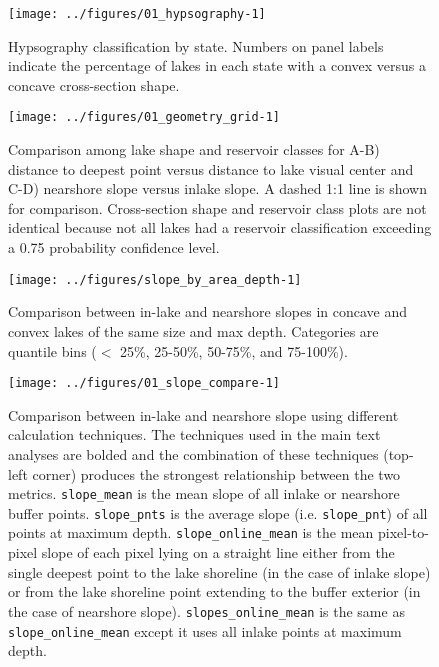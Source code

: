 \documentclass[draft,wrr]{agutexSI2019}
\begin{document}
\clearpage

\begin{figure}
      \noindent\texttt{[image: ../figures/01\_hypsography-1]}
      \caption{Hypsography classification by state. Numbers on panel labels indicate the percentage of lakes in each state with a convex versus a concave cross-section shape.}\label{figS2}
\end{figure}

\begin{figure}
      \noindent\texttt{[image: ../figures/01\_geometry\_grid-1]}
      \caption{Comparison among lake shape and reservoir classes for A-B) distance to deepest point versus distance to lake visual center and C-D) nearshore slope versus inlake slope. A dashed 1:1 line is shown for comparison. Cross-section shape and reservoir class plots are not identical because not all lakes had a reservoir classification exceeding a 0.75 probability confidence level.}\label{figS3}
\end{figure}

\begin{figure}
      \begin{center}
            \texttt{[image: ../figures/slope\_by\_area\_depth-1]}
      \end{center}
      \caption{Comparison between in-lake and nearshore slopes in concave and convex lakes of the same size and max depth. Categories are quantile bins ($<$ 25\%, 25-50\%, 50-75\%, and 75-100\%).}\label{figS4}
\end{figure}
\clearpage

\begin{figure}
      \begin{center}
            \texttt{[image: ../figures/01\_slope\_compare-1]}
      \end{center}
      \caption{Comparison between in-lake and nearshore slope using different calculation techniques. The techniques used in the main text analyses are bolded and the combination of these techniques (top-left corner) produces the strongest relationship between the two metrics. \texttt{slope\_mean} is the mean slope of all inlake or nearshore buffer points. \texttt{slope\_pnts} is the average slope (i.e. \texttt{slope\_pnt}) of all points at maximum depth. \texttt{slope\_online\_mean} is the mean pixel-to-pixel slope of each pixel lying on a straight line either from the single deepest point to the lake shoreline (in the case of inlake slope) or from the lake shoreline point extending to the buffer exterior (in the case of nearshore slope). \texttt{slopes\_online\_mean} is the same as \texttt{slope\_online\_mean} except it uses all inlake points at maximum depth.}\label{figS5}
\end{figure}
\clearpage
\end{document}
